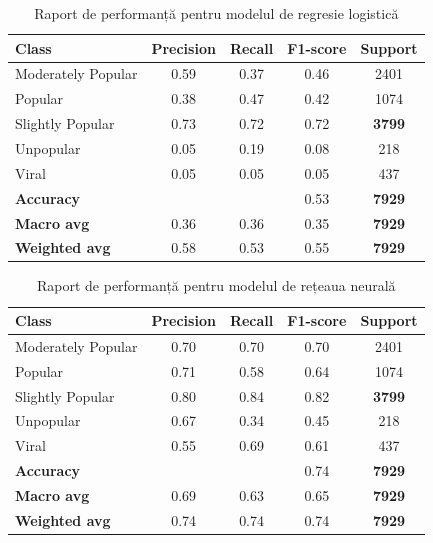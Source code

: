 \documentclass{article}
\begin{document}
\begin{table}[ht]
\centering
\begin{tabular}{lcccc}
\hline
\textbf{Class} & \textbf{Precision} & \textbf{Recall} & \textbf{F1-score} & \textbf{Support} \\
\hline
Moderately Popular   & 0.59 & 0.37 & 0.46 & 2401 \\
Popular              & 0.38 & 0.47 & 0.42 & 1074 \\
Slightly Popular     & 0.73 & 0.72 & 0.72 & \textbf{3799} \\
Unpopular            & 0.05 & 0.19 & 0.08 & 218  \\
Viral                & 0.05 & 0.05 & 0.05 & 437  \\
\hline
\textbf{Accuracy}    &      &      & 0.53 & \textbf{7929} \\
\textbf{Macro avg}   & 0.36 & 0.36 & 0.35 & \textbf{7929} \\
\textbf{Weighted avg}& 0.58 & 0.53 & 0.55 & \textbf{7929} \\
\hline
\end{tabular}
\caption{Raport de performanță pentru modelul de regresie logistică}
\end{table}

\begin{table}[ht]
\centering
\begin{tabular}{lcccc}
\hline
\textbf{Class} & \textbf{Precision} & \textbf{Recall} & \textbf{F1-score} & \textbf{Support} \\
\hline
Moderately Popular   & 0.70 & 0.70 & 0.70 & 2401 \\
Popular              & 0.71 & 0.58 & 0.64 & 1074 \\
Slightly Popular     & 0.80 & 0.84 & 0.82 & \textbf{3799} \\
Unpopular            & 0.67 & 0.34 & 0.45 & 218  \\
Viral                & 0.55 & 0.69 & 0.61 & 437  \\
\hline
\textbf{Accuracy}    &      &      & 0.74 & \textbf{7929} \\
\textbf{Macro avg}   & 0.69 & 0.63 & 0.65 & \textbf{7929} \\
\textbf{Weighted avg}& 0.74 & 0.74 & 0.74 & \textbf{7929} \\
\hline
\end{tabular}
\caption{Raport de performanță pentru modelul de rețeaua neurală}
\end{table}
\end{document}
